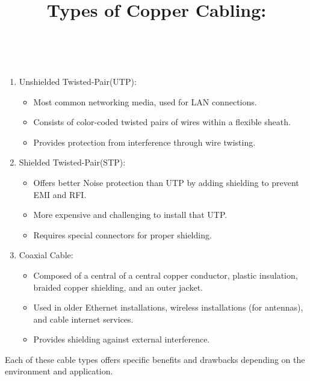 \documentclass[a4paper,11pt]{article}
\begin{document}
\title{Types of Copper Cabling:}\\
\begin{enumerate}
    \item Unshielded Twisted-Pair(UTP):\\
    \begin{itemize}
        \item Most common networking media, used for LAN connections.\\
        \item Consists of color-coded twisted pairs of wires within a flexible sheath.\\
        \item Provides protection from interference through wire twisting.\\
    \end{itemize}
    \item Shielded Twisted-Pair(STP):\\
    \begin{itemize}
        \item Offers better Noise protection than UTP by adding shielding to prevent EMI and RFI.\\
        \item More expensive and challenging to install that UTP.\\
        \item Requires special connectors for proper shielding.\\
    \end{itemize}
    \item Coaxial Cable:\\
    \begin{itemize}
        \item Composed of a central of a central copper conductor, plastic insulation, braided copper shielding, and an outer jacket.\\
        \item Used in older Ethernet installations, wireless installations (for antennas), and cable internet services.\\
        \item Provides shielding against external interference.\\
    \end{itemize}
\end{enumerate}

Each of these cable types offers specific benefits and drawbacks depending on the environment and application.\\
\end{document}
